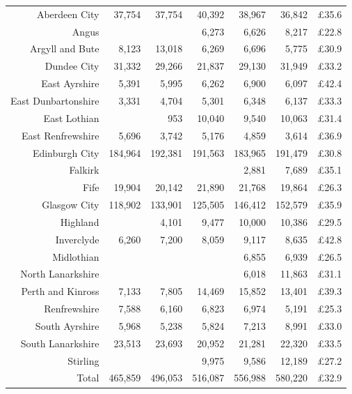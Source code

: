 \documentclass[
  12pt,
]{article}
\begin{document}
\begin{longtable}[t]{rrrrrrr}
\endfoot
\bottomrule
\endlastfoot
Aberdeen City & 37,754 & 37,754 & 40,392 & 38,967 & 36,842 & £35.6\\
Angus &  &  & 6,273 & 6,626 & 8,217 & £22.8\\
Argyll and Bute & 8,123 & 13,018 & 6,269 & 6,696 & 5,775 & £30.9\\
Dundee City & 31,332 & 29,266 & 21,837 & 29,130 & 31,949 & £33.2\\
East Ayrshire & 5,391 & 5,995 & 6,262 & 6,900 & 6,097 & £42.4\\
East Dunbartonshire & 3,331 & 4,704 & 5,301 & 6,348 & 6,137 & £33.3\\
East Lothian &  & 953 & 10,040 & 9,540 & 10,063 & £31.4\\
East Renfrewshire & 5,696 & 3,742 & 5,176 & 4,859 & 3,614 & £36.9\\
Edinburgh City & 184,964 & 192,381 & 191,563 & 183,965 & 191,479 & £30.8\\
Falkirk &  &  &  & 2,881 & 7,689 & £35.1\\
Fife & 19,904 & 20,142 & 21,890 & 21,768 & 19,864 & £26.3\\
Glasgow City & 118,902 & 133,901 & 125,505 & 146,412 & 152,579 & £35.9\\
Highland &  & 4,101 & 9,477 & 10,000 & 10,386 & £29.5\\
Inverclyde & 6,260 & 7,200 & 8,059 & 9,117 & 8,635 & £42.8\\
Midlothian &  &  &  & 6,855 & 6,939 & £26.5\\
North Lanarkshire &  &  &  & 6,018 & 11,863 & £31.1\\
Perth and Kinross & 7,133 & 7,805 & 14,469 & 15,852 & 13,401 & £39.3\\
Renfrewshire & 7,588 & 6,160 & 6,823 & 6,974 & 5,191 & £25.3\\
South Ayrshire & 5,968 & 5,238 & 5,824 & 7,213 & 8,991 & £33.0\\
South Lanarkshire & 23,513 & 23,693 & 20,952 & 21,281 & 22,320 & £33.5\\
Stirling &  &  & 9,975 & 9,586 & 12,189 & £27.2\\
\midrule
Total & 465,859 & 496,053 & 516,087 & 556,988 & 580,220 & £32.9\\*
\end{longtable}
\endgroup{}
\newpage
\begingroup\fontsize{10}{12}\selectfont
\end{document}
